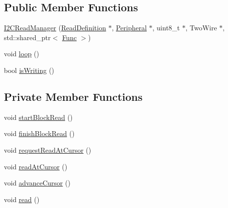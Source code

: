 \subsection*{Public Member Functions}
\begin{DoxyCompactItemize}
\item 
\mbox{\hyperlink{class_i2_c_read_manager_a32c36b6f8c14cc7c8d845b2c9e4e3884}{I2\+C\+Read\+Manager}} (\mbox{\hyperlink{struct_read_definition}{Read\+Definition}} $\ast$, \mbox{\hyperlink{struct_peripheral}{Peripheral}} $\ast$, uint8\+\_\+t $\ast$, Two\+Wire $\ast$, std\+::shared\+\_\+ptr$<$ \mbox{\hyperlink{_scheduler_8h_a2125a5a2949d6ee13163b671159c0d4d}{Func}} $>$)
\item 
void \mbox{\hyperlink{class_i2_c_read_manager_a5ce39fa21f4cba4e6ea32899991d327e}{loop}} ()
\item 
bool \mbox{\hyperlink{class_i2_c_read_manager_a570077135c889571f51a1b68b30faaad}{is\+Writing}} ()
\end{DoxyCompactItemize}
\subsection*{Private Member Functions}
\begin{DoxyCompactItemize}
\item 
void \mbox{\hyperlink{class_i2_c_read_manager_a478faffbf411c694c81668c9687177bd}{start\+Block\+Read}} ()
\item 
void \mbox{\hyperlink{class_i2_c_read_manager_ab56d84786e053cd555e11c67eeed1d27}{finish\+Block\+Read}} ()
\item 
void \mbox{\hyperlink{class_i2_c_read_manager_a069f4a54d98b35f365b04f7272b30cd3}{request\+Read\+At\+Cursor}} ()
\item 
void \mbox{\hyperlink{class_i2_c_read_manager_ad9b045650b074a8b10ea472dec42cf71}{read\+At\+Cursor}} ()
\item 
void \mbox{\hyperlink{class_i2_c_read_manager_a3b901ae787a7e5c94004ed70fea67c49}{advance\+Cursor}} ()
\item 
void \mbox{\hyperlink{class_i2_c_read_manager_a7d4d8b3241291a25c7e82821d33df4db}{read}} ()
\end{DoxyCompactItemize}
